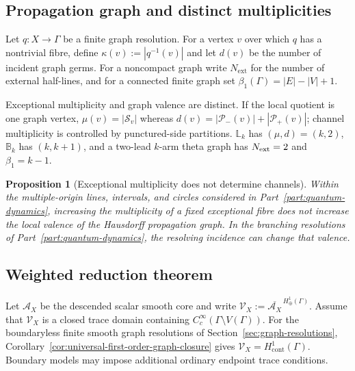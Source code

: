 \documentclass[11pt]{article}
\theoremstyle{plain}
\newtheorem{proposition}[theorem]{Proposition}
\theoremstyle{definition}
\begin{document}
\subsection{Propagation graph and distinct multiplicities}
\label{subsec:propagation-graph}
\label{subsec:three-multiplicities}
\label{subsec:local-incidence-partitions}

Let \(q:X\longrightarrow\Gamma\) be a finite graph resolution. For a vertex \(v\) over which \(q\) has a
nontrivial fibre, define \(\kappa(v):=|q^{-1}(v)|\) and let \(d(v)\) be the number of incident graph germs. For a noncompact graph write \(N_{\mathrm{ext}}\) for the number of external half-lines, and for a connected finite graph set
\(\beta_1(\Gamma)=|E|-|V|+1\).

Exceptional multiplicity and graph valence are distinct. If the local quotient is one graph vertex, \(\mu(v)=|\mathcal S_v|\) whereas \(d(v)=|\mathcal P_-(v)|+|\mathcal P_+(v)|\); channel multiplicity is controlled by punctured-side partitions. \(\mathbb L_k\) has \((\mu,d)=(k,2)\), \(\mathbb B_k\) has \((k,k+1)\), and a two-lead \(k\)-arm theta graph has \(N_{\rm ext}=2\) and \(\beta_1=k-1\).



\begin{proposition}[Exceptional multiplicity does not determine channels]
\label{prop:multiple-origin-channel-invariance}
Within the multiple-origin lines, intervals, and circles considered in
Part~\ref{part:quantum-dynamics}, increasing the multiplicity of a fixed exceptional fibre does not
increase the local valence of the Hausdorff propagation graph. In the
branching resolutions of Part~\ref{part:quantum-dynamics}, the resolving incidence can change that
valence.
\end{proposition}

\subsection{Weighted reduction theorem}
\label{subsec:weighted-Hausdorff-reduction}
\label{subsec:topology-through-measure}

Let \(\mathcal A_X\) be the descended scalar smooth core and write
\(\mathcal V_X := \overline{\mathcal A_X}^{\,H^1_\oplus(\Gamma)}\).
Assume that \(\mathcal V_X\) is a closed trace domain containing
\(C_c^\infty(\Gamma\setminus V(\Gamma))\). For the boundaryless finite smooth
graph resolutions of Section~\ref{sec:graph-resolutions},
Corollary~\ref{cor:universal-first-order-graph-closure} gives
\(\mathcal V_X=H^1_{\mathrm{cont}}(\Gamma)\).
Boundary models may impose additional ordinary endpoint trace conditions.
\end{document}
